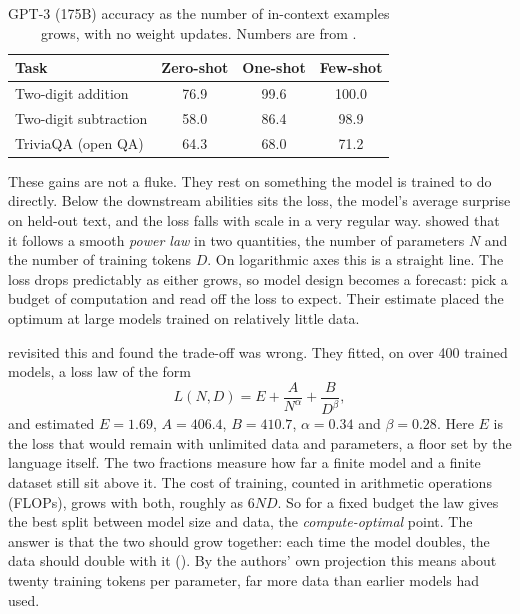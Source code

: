 \begin{table}[t]
\centering
\small
\begin{tabular}{l S[table-format=3.1] S[table-format=3.1] S[table-format=3.1]}
\toprule
\textbf{Task} & {\textbf{Zero-shot}} & {\textbf{One-shot}} & {\textbf{Few-shot}} \\
\midrule
Two-digit addition    & 76.9 & 99.6 & 100.0 \\
Two-digit subtraction & 58.0 & 86.4 & 98.9 \\
TriviaQA (open QA)     & 64.3 & 68.0 & 71.2 \\
\bottomrule
\end{tabular}
\caption{GPT-3 (175B) accuracy as the number of in-context examples grows, with no
weight updates. Numbers are from \citet{gpt3}.}
\label{tab:lm-fewshot}
\end{table}

These gains are not a fluke. They rest on something the model is trained to do
directly. Below the downstream abilities sits the loss, the model's average surprise
on held-out text, and the loss falls with scale in a very regular way.
\citet{kaplan_scaling} showed that it follows a smooth \emph{power law} in two
quantities, the number of parameters $N$ and the number of training tokens $D$. On
logarithmic axes this is a straight line. The loss drops predictably as either grows,
so model design becomes a forecast: pick a budget of computation and read off the loss
to expect. Their estimate placed the optimum at large models trained on relatively
little data.

\citet{chinchilla_scaling} revisited this and found the trade-off was wrong. They
fitted, on over 400 trained models, a loss law of the form
\[
  L(N, D) = E + \frac{A}{N^{\alpha}} + \frac{B}{D^{\beta}},
\]
and estimated $E = 1.69$, $A = 406.4$, $B = 410.7$, $\alpha = 0.34$ and
$\beta = 0.28$. Here $E$ is the loss that would remain with unlimited data and
parameters, a floor set by the language itself. The two fractions measure how far a
finite model and a finite dataset still sit above it. The cost of training, counted in
arithmetic operations (FLOPs), grows with both, roughly as $6ND$. So for a fixed budget
the law gives the best split between model size and data, the \emph{compute-optimal}
point. The answer is that the two should grow together: each time the model doubles,
the data should double with it (). By the authors' own
projection this means about twenty training tokens per parameter, far more data than
earlier models had used.

